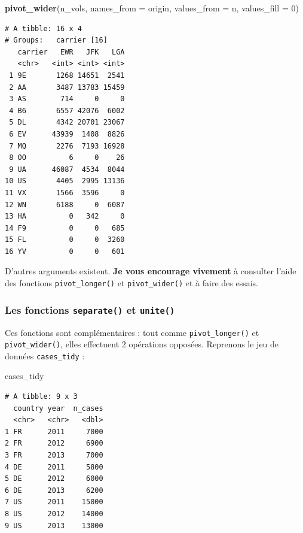 \documentclass[
  a4paper,
]{article}
\newenvironment{Shaded}{\begin{snugshade}}{\end{snugshade}}
\newcommand{\DataTypeTok}[1]{\textcolor[rgb]{0.00,0.34,0.68}{#1}}
\newcommand{\DecValTok}[1]{\textcolor[rgb]{0.69,0.50,0.00}{#1}}
\newcommand{\KeywordTok}[1]{\textcolor[rgb]{0.12,0.11,0.11}{\textbf{#1}}}
\newcommand{\NormalTok}[1]{\textcolor[rgb]{0.12,0.11,0.11}{#1}}
\begin{document}
\begin{Shaded}
\begin{Highlighting}[]
\KeywordTok{pivot_wider}\NormalTok{(n_vols, }
            \DataTypeTok{names_from =}\NormalTok{ origin, }
            \DataTypeTok{values_from =}\NormalTok{ n, }
            \DataTypeTok{values_fill =} \DecValTok{0}\NormalTok{)}
\end{Highlighting}
\end{Shaded}

\begin{verbatim}
# A tibble: 16 x 4
# Groups:   carrier [16]
   carrier   EWR   JFK   LGA
   <chr>   <int> <int> <int>
 1 9E       1268 14651  2541
 2 AA       3487 13783 15459
 3 AS        714     0     0
 4 B6       6557 42076  6002
 5 DL       4342 20701 23067
 6 EV      43939  1408  8826
 7 MQ       2276  7193 16928
 8 OO          6     0    26
 9 UA      46087  4534  8044
10 US       4405  2995 13136
11 VX       1566  3596     0
12 WN       6188     0  6087
13 HA          0   342     0
14 F9          0     0   685
15 FL          0     0  3260
16 YV          0     0   601
\end{verbatim}

D'autres arguments existent. \textbf{Je vous encourage vivement} à consulter l'aide des fonctions \texttt{pivot\_longer()} et \texttt{pivot\_wider()} et à faire des essais.

\hypertarget{les-fonctions-separate-et-unite}{%
\subsubsection{\texorpdfstring{Les fonctions \texttt{separate()} et \texttt{unite()}}{Les fonctions separate() et unite()}}\label{les-fonctions-separate-et-unite}}

Ces fonctions sont complémentaires : tout comme \texttt{pivot\_longer()} et \texttt{pivot\_wider()}, elles effectuent 2 opérations opposées. Reprenons le jeu de données \texttt{cases\_tidy} :

\begin{Shaded}
\begin{Highlighting}[]
\NormalTok{cases_tidy}
\end{Highlighting}
\end{Shaded}

\begin{verbatim}
# A tibble: 9 x 3
  country year  n_cases
  <chr>   <chr>   <dbl>
1 FR      2011     7000
2 FR      2012     6900
3 FR      2013     7000
4 DE      2011     5800
5 DE      2012     6000
6 DE      2013     6200
7 US      2011    15000
8 US      2012    14000
9 US      2013    13000
\end{verbatim}
\end{document}

